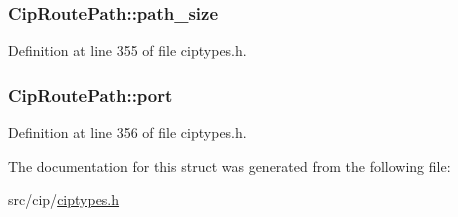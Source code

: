 \hypertarget{structCipRoutePath_a4e5b2e40afee896e16498f88ebbb4525}{
\subsubsection[{path\-\_\-size}]{ {\bf \-Cip\-Route\-Path\-::path\-\_\-size}}}\label{d4/d41/structCipRoutePath_a4e5b2e40afee896e16498f88ebbb4525}


\-Definition at line 355 of file ciptypes.\-h.

\hypertarget{structCipRoutePath_aa48072f67c76ef536c4cdf8b6f63f30a}{
\subsubsection[{port}]{ {\bf \-Cip\-Route\-Path\-::port}}}\label{d4/d41/structCipRoutePath_aa48072f67c76ef536c4cdf8b6f63f30a}


\-Definition at line 356 of file ciptypes.\-h.



\-The documentation for this struct was generated from the following file\-:\begin{DoxyCompactItemize}
\item 
src/cip/\hyperlink{ciptypes_8h}{ciptypes.\-h}\end{DoxyCompactItemize}
